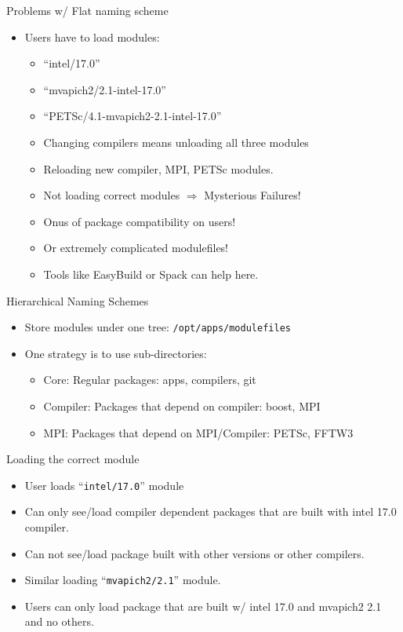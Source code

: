 \documentclass{beamer}
\begin{document}
\begin{frame}{Problems w/ Flat naming scheme}
  \begin{itemize}
    \item Users have to load modules:
      \begin{itemize}
        \item ``intel/17.0''
        \item ``mvapich2/2.1-intel-17.0''
        \item ``PETSc/4.1-mvapich2-2.1-intel-17.0''
        \item Changing compilers means unloading all three modules
        \item Reloading new compiler, MPI, PETSc modules.
        \item Not loading correct modules $\Rightarrow$ Mysterious Failures!
        \item Onus of package compatibility on users!
        \item Or extremely complicated modulefiles!
        \item Tools like EasyBuild or Spack can help here.
      \end{itemize}
  \end{itemize}
\end{frame}

\begin{frame}{Hierarchical Naming Schemes}
  \begin{itemize}
    \item Store modules under one tree: \texttt{/opt/apps/modulefiles}
    \item One strategy is to use sub-directories:
      \begin{itemize}
        \item Core: Regular packages: apps, compilers, git
        \item Compiler: Packages that depend on compiler: boost, MPI
        \item MPI: Packages that depend on MPI/Compiler: PETSc, FFTW3
      \end{itemize}
  \end{itemize}
\end{frame}

\begin{frame}{Loading the correct module}
  \begin{itemize}
    \item User loads ``\texttt{intel/17.0}'' module
    \item Can only see/load compiler dependent packages that are built with
      intel 17.0 compiler.
    \item Can not see/load package built with other versions or other compilers.
    \item Similar loading ``\texttt{mvapich2/2.1}'' module.
    \item Users can only load package that are built w/ intel 17.0 and
      mvapich2 2.1 and no others.
  \end{itemize}
\end{frame}
\end{document}
